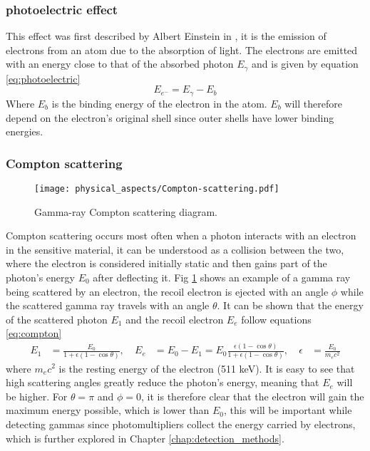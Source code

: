 \subsubsection{photoelectric effect}

This effect was first described by Albert Einstein in \cite{einstein1905heuristic}, it is the emission of electrons from an atom due to the absorption of light. The electrons are emitted with an energy close to that of the absorbed photon $E_\gamma$ and is given by equation \eqref{eq:photoelectric}
\begin{equation}
  E_{e^-} = E_\gamma - E_b \label{eq:photoelectric}
\end{equation}
Where $E_b$ is the binding energy of the electron in the atom. $E_b$ will therefore depend on the electron's original shell since outer shells have lower binding energies.

\subsubsection{Compton scattering}\label{sec:compt_scattering}

\begin{figure}[H]
  \centering
  \texttt{[image: physical\_aspects/Compton-scattering.pdf]}
  \caption{\label{fig:Compton_scattering_diagram}Gamma-ray Compton scattering diagram.}
\end{figure}

Compton scattering occurs most often when a photon interacts with an electron in the sensitive material, it can be understood as a collision between the two, where the electron is considered initially static and then gains part of the photon's energy $E_0$ after deflecting it. Fig \ref{fig:Compton_scattering_diagram} shows an example of a gamma ray being scattered by an electron, the recoil electron is ejected with an angle $\phi$ while the scattered gamma ray travels with an angle $\theta$. It can be shown that the energy of the scattered photon $E_{1}$ and the recoil electron $E_e$ follow equations \eqref{eq:compton}
\begin{align}
  E_{1} &= \frac{E_0}{1+\epsilon(1-\cos\theta)} \label{eq:compton},~ & E_e &= E_0 - E_1 = E_0\frac{\epsilon(1-\cos\theta)}{1+\epsilon(1-\cos\theta)},~ & \epsilon&=\frac{E_0}{m_{e}c^2} 
\end{align}
where $m_e c^2$ is the resting energy of the electron (511 \unit{\kilo\eV}). It is easy to see that high scattering angles greatly reduce the photon's energy, meaning that $E_e$ will be higher. For $\theta=\pi$ and $\phi=0$, it is therefore clear that the electron will gain the maximum energy possible, which is lower than $E_0$, this will be important while detecting gammas since photomultipliers collect the energy carried by electrons, which is further explored in Chapter \ref{chap:detection_methods}.


